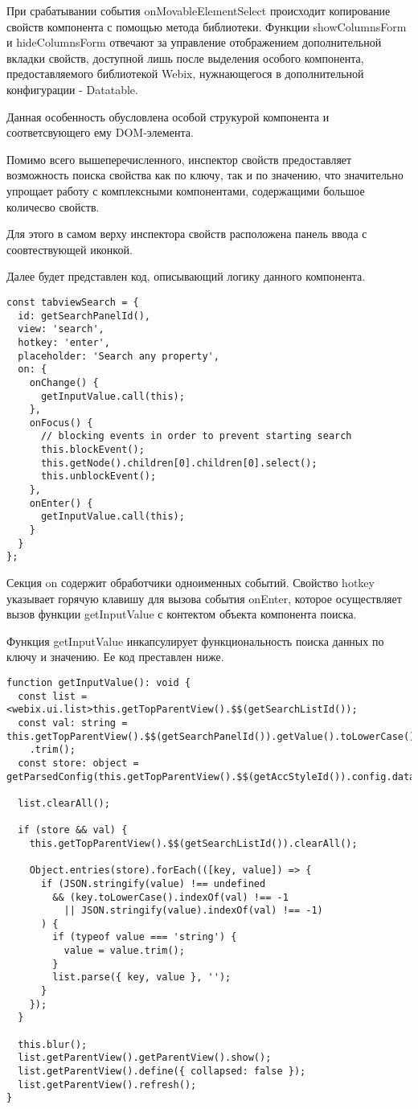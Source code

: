 При срабатывании события onMovableElementSelect происходит копирование свойств компонента с помощью метода библиотеки. Функции showColumnsForm и hideColumnsForm отвечают за управление отображением дополнительной вкладки свойств, доступной лишь после выделения особого компонента, предоставляемого библиотекой Webix, нужнающегося в дополнительной конфигурации - Datatable.

Данная особенность обусловлена особой струкурой компонента и соответсвующего ему DOM-элемента.

Помимо всего вышеперечисленного, инспектор свойств предоставляет возможность поиска свойства как по ключу, так и по значению, что значительно упрощает работу с комплексными компонентами, содержащими большое количесво свойств.

Для этого в самом верху инспектора свойств расположена панель ввода с соовтествующей иконкой.

Далее будет представлен код, описывающий логику данного компонента.

\begin{lstlisting}
const tabviewSearch = {
  id: getSearchPanelId(),
  view: 'search',
  hotkey: 'enter',
  placeholder: 'Search any property',
  on: {
    onChange() {
      getInputValue.call(this);
    },
    onFocus() {
      // blocking events in order to prevent starting search
      this.blockEvent();
      this.getNode().children[0].children[0].select();
      this.unblockEvent();
    },
    onEnter() {
      getInputValue.call(this);
    }
  }
};
\end{lstlisting}

Секция on содержит обработчики одноименных событий. Свойство hotkey указывает горячую клавишу для вызова события onEnter, которое осуществляет вызов функции getInputValue с контектом объекта компонента поиска.

Функция getInputValue инкапсулирует функциональность поиска данных по ключу и значению. Ее код преставлен ниже.

\begin{lstlisting}
function getInputValue(): void {
  const list = <webix.ui.list>this.getTopParentView().$$(getSearchListId());
  const val: string = this.getTopParentView().$$(getSearchPanelId()).getValue().toLowerCase()
    .trim();
  const store: object = getParsedConfig(this.getTopParentView().$$(getAccStyleId()).config.data);

  list.clearAll();

  if (store && val) {
    this.getTopParentView().$$(getSearchListId()).clearAll();

    Object.entries(store).forEach(([key, value]) => {
      if (JSON.stringify(value) !== undefined
        && (key.toLowerCase().indexOf(val) !== -1
          || JSON.stringify(value).indexOf(val) !== -1)
      ) {
        if (typeof value === 'string') {
          value = value.trim();
        }
        list.parse({ key, value }, '');
      }
    });
  }

  this.blur();
  list.getParentView().getParentView().show();
  list.getParentView().define({ collapsed: false });
  list.getParentView().refresh();
}
\end{lstlisting}

